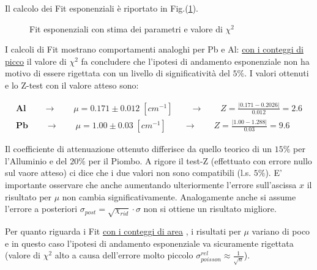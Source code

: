 \documentclass[12pt,a4paper,openright,twoside]{article}
\numberwithin{equation}{section} %
\begin{document}
Il calcolo dei Fit esponenziali è riportato in Fig.(\ref{fit}).


\begin{figure}[h]
 \centering
   \caption{Fit esponenziali con stima dei parametri e valore di $\chi ^2$}
   \label{fit}
 \end{figure}

I calcoli di Fit mostrano comportamenti analoghi per Pb e Al: \underline{con i conteggi di picco} il valore di $\chi ^2$ fa concludere che l'ipotesi di andamento esponenziale non ha motivo di essere rigettata con un livello di significatività del $5 \%$.
I valori ottenuti e lo Z-test con il valore atteso sono:

\begin{gather}
\mathbf{Al} \qquad \rightarrow \qquad \mu = 0.171 \pm 0.012 \; [cm^{-1}] \qquad \rightarrow \qquad Z=\frac{|0.171-0.2026|}{0.012}=2.6 \\ 
\mathbf{Pb} \qquad \rightarrow \qquad \mu = 1.00 \pm 0.03 \; [cm^{-1}] \qquad \rightarrow \qquad Z=\frac{|1.00-1.288|}{0.03}=9.6
\label{ris}
\end{gather}

Il coefficiente di attenuazione ottenuto differisce da quello teorico di un $15 \% $ per l'Alluminio e del $20 \% $ per il Piombo.
A rigore il test-Z (effettuato con errore nullo sul vaore atteso) ci dice che i due valori non sono compatibili (l.s. $5\%$).
E' importante osservare che anche aumentando ulteriormente l'errore sull'ascissa $x$ il risultato per $\mu$ non cambia significativamente.
Analogamente anche si assume l'errore a posteriori $\sigma_{post}= \sqrt{\chi_{rid}} \cdot \sigma$ non si ottiene un risultato migliore.

Per quanto riguarda i Fit \underline{con i conteggi di area} , i risultati per $\mu$ variano di poco e in questo caso l'ipotesi di andamento esponenziale va sicuramente rigettata (valore di $\chi ^2$ alto a causa dell'errore molto piccolo $ \sigma_{ poisson} ^{rel} \approx \frac{1}{\sqrt{n}}$).
\end{document}
